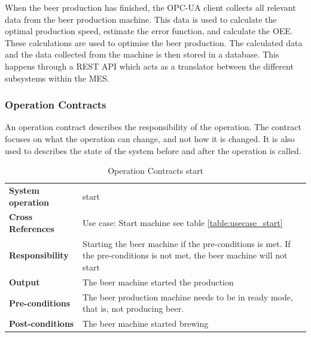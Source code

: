 When the beer production has finished, the OPC-UA client collects all relevant
data from the beer production machine. This data is used to calculate the
optimal production speed, estimate the error function, and calculate the OEE.
These calculations are used to optimise the beer production. The calculated data
and the data collected from the machine is then stored in a database. This
happens through a REST API which acts as a translator between the different 
subsystems within the MES.

\subsubsection{Operation Contracts}
An operation contract describes the responsibility of the operation. 
The contract focuses on what the operation can change, and not how it is changed. 
It is also used to describes the state of the system before and after the 
operation is called.

\begin{table}[H]
    \begin{tabularx}{\textwidth}{|>{\RaggedRight}p{3.7cm}|>{\RaggedRight}X|}
        \hline
        \multicolumn{2}{|c|}{\textbf{start}}\\
        \hline
        \textbf{System operation} & start\\
        \hline
        \textbf{Cross References} & Use case: Start machine see table \ref{table:usecase_start} \\
        \hline
        \textbf{Responsibility} & Starting the beer machine if the pre-conditions 
        is met.
            If the pre-conditions is not met, the beer machine will not start \\
        \hline
        \textbf{Output} & The beer machine started the production\\
        \hline
        \textbf{Pre-conditions} & 
            The beer production machine needs to be in
            ready mode, that is, not producing beer. \\
        \hline
        \textbf{Post-conditions} & The beer machine started brewing\\
        \hline
    \end{tabularx}
    \caption{Operation Contracts start} 
    \label{table:Operation_Contracts_start}
\end{table}

